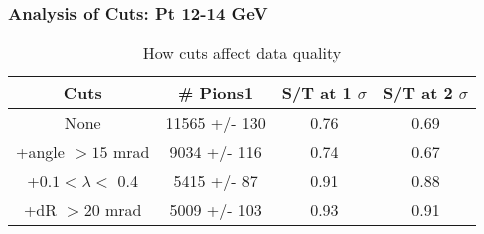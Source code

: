 \frame
{
\frametitle{Analysis of Cuts: Pt 12-14 GeV}
\begin{table}
\caption{How cuts affect data quality}
\centering
\begin{tabular}{c c c c}
\hline\hline
Cuts & \# Pions1 & S/T at 1 $\sigma$ & S/T at 2 $\sigma$ \\ [0.5ex]
\hline
None & 11565 +/-  130 & 0.76 & 0.69 \\ %
+angle $> 15$ mrad & 9034 +/-  116 & 0.74 & 0.67 \\ %
+$0.1 < \lambda <$ 0.4 & 5415 +/-   87 & 0.91 & 0.88 \\ %
+dR $> 20$ mrad & 5009 +/-  103 & 0.93 & 0.91 \\ %
[1ex]
\hline
\end{tabular}
\label{table:nonlin}
\end{table}
}
